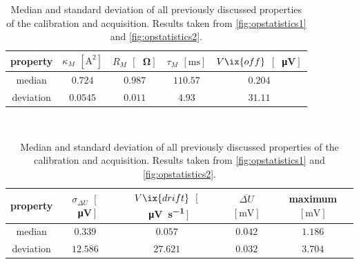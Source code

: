             \begin{table}[t]%
                \centering%
                \begin{tabular}{||c|c|c|c|c||}%
                    \hline\rule{0pt}{.75\normalbaselineskip}%
                    property & $\kappa_{M}$ $\left[\text{A}^{2}\right]$ & $R_{M}$ $\left[\right.$\SI{}{\ohm}$\left.\right]$ & $\tau_{M}$ $\left[\text{ms}\right]$ & $V\ix{off}$ $\left[\right.$\SI{}{\micro\volt}$\left.\right]$ \\[.5ex]\hline\hline%
                    median & $0.724$ & $0.987$ & $110.57$ & $0.204$ \\\hline%
                    deviation & $0.0545$ & $0.011$ & $4.93$ & $31.11$ \\[.5ex]\hline%
                \end{tabular}%
                \\[1ex]%
                \begin{tabular}{||c|c|c|c|c||}%
                    \hline\rule{0pt}{.75\normalbaselineskip}%
                    property & $\sigma_{\Delta U}$ $\left[\right.$\SI{}{\micro\volt}$\left.\right]$ & $V\ix{drift}$ $\left[\right.$\SI{}{\micro\volt\per\second}$\left.\right]$ & $\overline{\Delta U}$ $\left[\text{mV}\right]$ & maximum $\left[\text{mV}\right]$ \\[.5ex]\hline\hline%
                    median & $0.339$ & $0.057$ & $0.042$ & $1.186$ \\\hline%
                    deviation & $12.586$ & $27.621$ & $0.032$ & $3.704$ \\[.5ex]\hline%
                \end{tabular}%
                \vspace*{0.5cm}%
                \caption{Median and standard deviation of all previously discussed properties of the calibration and acquisition. Results taken from \cref{fig:opstatistics1} and \cref{fig:opstatistics2}.}\label{tab:stat_numbers}%
            \end{table}%
%
